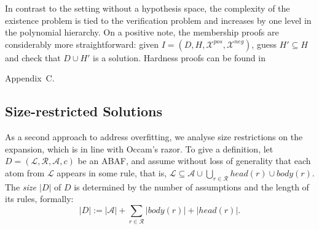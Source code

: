 \documentclass[letterpaper]{article} %
\newcommand{\TODO}[1]{\todo[inline]{ #1}}
\newcommand{\lit}{\ensuremath{\mathcal{L}}}
\newcommand{\rules}{\ensuremath{\mathcal{R}}}
\newcommand{\asm}{\ensuremath{\mathcal{A}}}
\newcommand{\atoms}{\mathcal{L}}
\newcommand{\ruleset}{\mathcal{R}}
\newcommand{\assumptions}{\mathcal{A}}
\newcommand{\contra}{c}
\newcommand{\ABAdef}{D=(\atoms,\ruleset,\assumptions,\contra)}
\newcommand{\ExLFE}[2]{\textsc{Ex-LFE}_{#1}^{#2}}
\newcommand{\ExLFL}[2]{\textsc{Ex-LFL}_{#1}^{#2}}
\newcommand{\hypo}{H}
\newcommand{\Xpos}{\mathcal{X}^{pos}}
\newcommand{\Xneg}{\mathcal{X}^{neg}}
\newcommand{\QSATA}[1]{\mathit{QSAT}^\forall_{#1}}
\newcommand{\QSATE}[1]{\mathit{QSAT}^\exists_{#1}}
\newif\ifappendix
\begin{document}
In contrast to the setting without a hypothesis space, the complexity of the existence problem is tied to the verification problem and increases by one level in the polynomial hierarchy. On a positive note, the membership proofs are considerably more straightforward: given $I=(D,\hypo,\Xpos,\Xneg)$, guess $H'\subseteq \hypo$ and check that $D\cup H'$ is a solution. 
Hardness proofs can be found in 
\ifappendix 
    Appendix~\ref{app:complexity existence hypo}.
\else 
    Appendix~C.
\fi












\subsection{Size-restricted Solutions}\label{sec:optimal solutions}\label{sec:k optimal solutions}
\newcommand{\OptLFE}[2]{\textsc{srEx-LFE}_{#1}^{#2}}
\newcommand{\OptLFL}[2]{\textsc{srEx-LFL}_{#1}^{#2}}

As a second approach to address overfitting, we analyse size restrictions on the expansion, which is in line with Occam's razor. To give a definition,
let $\ABAdef$ be an ABAF, and assume without loss of generality that each atom from $\lit$ appears in some rule, that is,  $\lit\subseteq \asm\cup \bigcup_{r\in \mathcal{R}}head(r)\cup body(r)$. 
The \emph{size $|D|$} of $D$ is determined by the number of assumptions and the length of its rules, formally:
$$|D|:= |\asm|+\sum_{r\in \rules}|body(r)|+|head(r)|.$$
\end{document}
